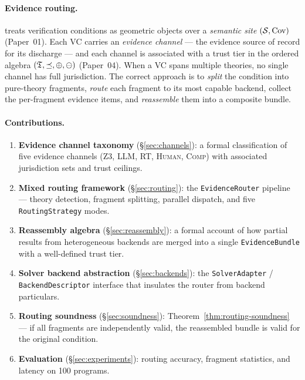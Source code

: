 \documentclass[11pt]{article}
\providecommand{\numroute}{100}
\begin{document}
\paragraph{Evidence routing.}
\JuGeo{} treats verification conditions as geometric objects over a
\emph{semantic site} $(\mathcal{S},\mathrm{Cov})$ (Paper~01).  Each \textsc{VC}
carries an \emph{evidence channel} — the evidence source of record for
its discharge — and each channel is associated with a trust tier in the
ordered algebra $(\mathfrak{T},\preceq,\oplus,\ominus)$ (Paper~04).  When a
\textsc{VC} spans multiple theories, no single channel has full
jurisdiction.  The correct approach is to \emph{split} the condition
into pure-theory fragments, \emph{route} each fragment to its most
capable backend, collect the per-fragment evidence items, and
\emph{reassemble} them into a composite bundle.

\paragraph{Contributions.}
\begin{enumerate}[label=(\roman*)]
  \item \textbf{Evidence channel taxonomy} (\S\ref{sec:channels}): a
    formal classification of five evidence channels (\textsc{Z3},
    \textsc{LLM}, \textsc{RT}, \textsc{Human}, \textsc{Comp}) with
    associated jurisdiction sets and trust ceilings.
  \item \textbf{Mixed routing framework} (\S\ref{sec:routing}): the
    \texttt{EvidenceRouter} pipeline — theory detection, fragment
    splitting, parallel dispatch, and five \texttt{RoutingStrategy}
    modes.
  \item \textbf{Reassembly algebra} (\S\ref{sec:reassembly}): a
    formal account of how partial results from heterogeneous backends
    are merged into a single \texttt{EvidenceBundle} with a
    well-defined trust tier.
  \item \textbf{Solver backend abstraction} (\S\ref{sec:backends}):
    the \texttt{SolverAdapter} / \texttt{BackendDescriptor} interface
    that insulates the router from backend particulars.
  \item \textbf{Routing soundness} (\S\ref{sec:soundness}):
    Theorem~\ref{thm:routing-soundness} — if all fragments are
    independently valid, the reassembled bundle is valid for the
    original condition.
  \item \textbf{Evaluation} (\S\ref{sec:experiments}): routing
    accuracy, fragment statistics, and latency on \numroute{} programs.
\end{enumerate}
\end{document}
